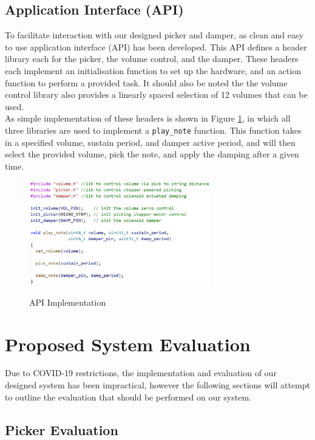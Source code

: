 \documentclass[a4paper,11pt]{article}
\newcommand{\code}[1]{\colorbox{codegray}{\texttt{#1}}}
\begin{document}
\subsection{Application Interface (API)}

To facilitate interaction with our designed picker and damper, as clean and easy to use application interface (API) has been developed. This API defines a header library each for the picker, the volume control, and the damper. These headers each implement an initialisation  function to set up the hardware, and an action function to perform a provided task. It should also be noted the the volume control library also provides a linearly spaced selection of 12 volumes that can be used. \\

As simple implementation of these headers is shown in Figure \ref{F:code}, in which all three libraries are used to implement a \code{play\_note} function. This function takes in a specified volume, sustain period, and damper active period, and will then select the provided volume, pick the note, and apply the damping after a given time.

\begin{figure}[h!]
  \begin{center}
    \includegraphics[width=0.7\textwidth]{code}
    \label{F:code}
    \caption{API Implementation}
  \end{center}
\end{figure}

\section{Proposed System Evaluation}

Due to COVID-19 restrictions, the implementation and evaluation of our designed system has been impractical, however the following sections will attempt to outline the evaluation that should be performed on our system.

\subsection{Picker Evaluation}
\end{document}
